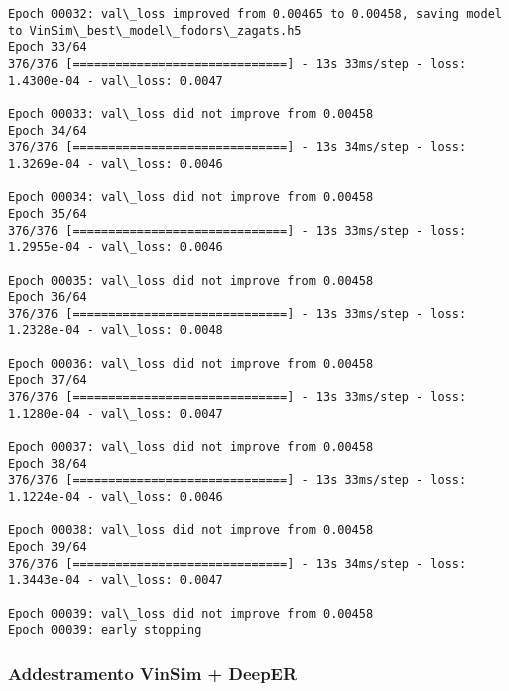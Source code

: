\documentclass[11pt]{article}
\begin{document}
\begin{Verbatim}[commandchars=\\\{\}]
Epoch 00032: val\_loss improved from 0.00465 to 0.00458, saving model to VinSim\_best\_model\_fodors\_zagats.h5
Epoch 33/64
376/376 [==============================] - 13s 33ms/step - loss: 1.4300e-04 - val\_loss: 0.0047

Epoch 00033: val\_loss did not improve from 0.00458
Epoch 34/64
376/376 [==============================] - 13s 34ms/step - loss: 1.3269e-04 - val\_loss: 0.0046

Epoch 00034: val\_loss did not improve from 0.00458
Epoch 35/64
376/376 [==============================] - 13s 33ms/step - loss: 1.2955e-04 - val\_loss: 0.0046

Epoch 00035: val\_loss did not improve from 0.00458
Epoch 36/64
376/376 [==============================] - 13s 33ms/step - loss: 1.2328e-04 - val\_loss: 0.0048

Epoch 00036: val\_loss did not improve from 0.00458
Epoch 37/64
376/376 [==============================] - 13s 33ms/step - loss: 1.1280e-04 - val\_loss: 0.0047

Epoch 00037: val\_loss did not improve from 0.00458
Epoch 38/64
376/376 [==============================] - 13s 33ms/step - loss: 1.1224e-04 - val\_loss: 0.0046

Epoch 00038: val\_loss did not improve from 0.00458
Epoch 39/64
376/376 [==============================] - 13s 34ms/step - loss: 1.3443e-04 - val\_loss: 0.0047

Epoch 00039: val\_loss did not improve from 0.00458
Epoch 00039: early stopping

    \end{Verbatim}

    \subsubsection{Addestramento VinSim +
DeepER}\label{addestramento-vinsim-deeper}
\end{document}
